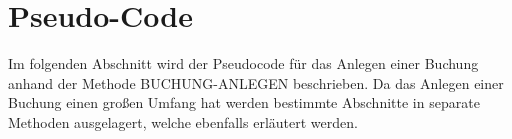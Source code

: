 








\newpage

\newpage

\section{Pseudo-Code}
Im folgenden Abschnitt wird der Pseudocode für das Anlegen einer Buchung anhand der Methode BUCHUNG-ANLEGEN beschrieben. Da das Anlegen einer Buchung einen großen Umfang hat werden bestimmte Abschnitte in separate Methoden ausgelagert, welche ebenfalls erläutert werden.

